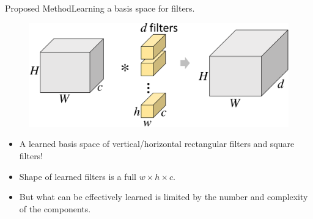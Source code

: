 \documentclass[t,xcolor=dvipsnames]{beamer}
\begin{document}
\begin{frame}{Proposed Method}{Learning a basis space for filters.}
\begin{figure}
   \includegraphics[width=\textwidth, page=4]{../Figs/PDF/sparsification}
\end{figure}
\begin{itemize}
    \item A learned basis space of vertical/horizontal rectangular filters and square filters!
    \item Shape of learned filters is a full $w \times h \times c$.
    \item But what can be effectively learned is limited by the number and complexity of the components.
\end{itemize}
\end{frame}

\datatable
{}\datatableours
{}\datatableaug
{}
\end{document}
